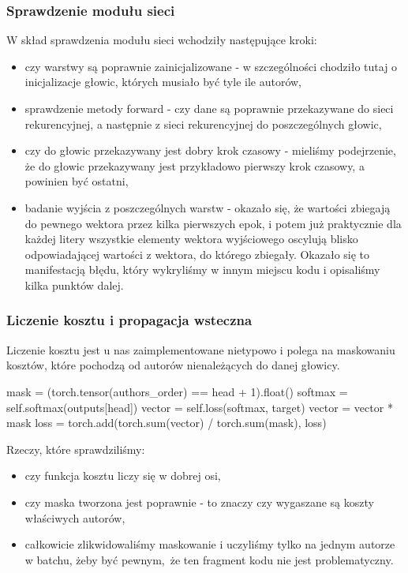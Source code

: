 \subsubsection{Sprawdzenie modułu sieci}
W skład sprawdzenia modułu sieci wchodziły następujące kroki:
	\begin{itemize}
	  \item {czy warstwy są poprawnie zainicjalizowane - w szczególności chodziło tutaj o inicjalizacje głowic,
	  których musiało być tyle ile autorów,}
	  \item {sprawdzenie metody forward - czy dane są poprawnie przekazywane do sieci rekurencyjnej, a następnie
	  z sieci rekurencyjnej do poszczególnych głowic,}
	  \item {czy do głowic przekazywany jest dobry krok czasowy - mieliśmy podejrzenie, że do głowic przekazywany jest przykładowo
	  pierwszy krok czasowy, a powinien być ostatni,}
	  \newpage
	  \item {badanie wyjścia z poszczególnych warstw - okazało się, że wartości zbiegają do pewnego wektora przez kilka pierwszych epok,
	  i potem już praktycznie dla każdej litery wszystkie elementy wektora wyjściowego oscylują blisko odpowiadającej wartości z  wektora,
	  do którego zbiegały. Okazało się to manifestacją błędu, który wykryliśmy w innym miejscu kodu i opisaliśmy kilka punktów dalej.}
	\end{itemize}

\subsubsection{Liczenie kosztu i propagacja wsteczna}
Liczenie kosztu jest u nas zaimplementowane nietypowo i polega na maskowaniu kosztów, które pochodzą od autorów
nienależących do danej głowicy.
\begin{python}
mask = (torch.tensor(authors_order) == head + 1).float()
softmax = self.softmax(outputs[head])
vector = self.loss(softmax, target)
vector = vector * mask
loss = torch.add(torch.sum(vector) / torch.sum(mask), loss)

\end{python}
Rzeczy, które sprawdziliśmy:
\begin{itemize}
	  \item {czy funkcja kosztu liczy się w dobrej osi,}
	  \item {czy maska tworzona jest poprawnie - to znaczy czy wygaszane są koszty właściwych autorów,}
	  \item {całkowicie zlikwidowaliśmy maskowanie i uczyliśmy tylko na jednym autorze w batchu, żeby być pewnym, że ten fragment
	  kodu nie jest problematyczny.}
\end{itemize}

